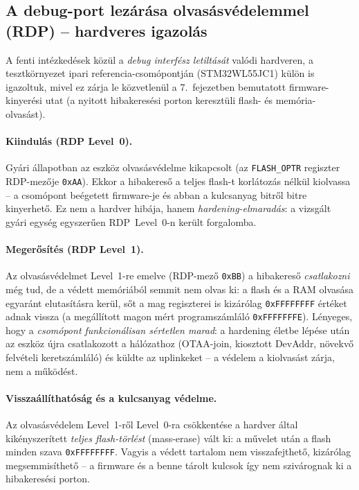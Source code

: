 \documentclass[12pt,a4paper]{article}
\begin{document}
\subsection{A debug-port lezárása olvasásvédelemmel (RDP) -- hardveres igazolás}

A fenti intézkedések közül a \emph{debug interfész letiltását} valódi
hardveren, a tesztkörnyezet ipari referencia-csomópontján
(STM32WL55JC1) külön is igazoltuk, mivel ez zárja le közvetlenül a
7.\ fejezetben bemutatott firmware-kinyerési utat (a nyitott
hibakeresési porton keresztüli flash- és memória-olvasást).

\paragraph{Kiindulás (RDP Level~0).} Gyári állapotban az eszköz
olvasásvédelme kikapcsolt (az \texttt{FLASH\_OPTR} regiszter RDP-mezője
\texttt{0xAA}). Ekkor a hibakereső a teljes flash-t korlátozás nélkül
kiolvassa -- a csomópont beégetett firmware-je és abban a kulcsanyag
bitről bitre kinyerhető. Ez nem a hardver hibája, hanem \emph{hardening-elmaradás}:
a vizsgált gyári egység egyszerűen RDP~Level~0-n került forgalomba.

\paragraph{Megerősítés (RDP Level~1).} Az olvasásvédelmet Level~1-re emelve
(RDP-mező \texttt{0xBB}) a hibakereső \emph{csatlakozni} még tud, de a
védett memóriából semmit nem olvas ki: a flash és a RAM olvasása egyaránt
elutasításra kerül, sőt a mag regiszterei is kizárólag \texttt{0xFFFFFFFF}
értéket adnak vissza (a megállított magon mért programszámláló
\texttt{0xFFFFFFFE}). Lényeges, hogy a \emph{csomópont funkcionálisan
sértetlen marad}: a hardening életbe lépése után az eszköz újra
csatlakozott a hálózathoz (OTAA-join, kiosztott DevAddr, növekvő
felvételi keretszámláló) és küldte az uplinkeket -- a védelem a
kiolvasást zárja, nem a működést.

\paragraph{Visszaállíthatóság és a kulcsanyag védelme.} Az olvasásvédelem
Level~1-ről Level~0-ra csökkentése a hardver által kikényszerített
\emph{teljes flash-törlést} (mass-erase) vált ki: a művelet után a flash
minden szava \texttt{0xFFFFFFFF}. Vagyis a védett tartalom nem
visszafejthető, kizárólag megsemmisíthető -- a firmware és a benne tárolt
kulcsok így nem szivárognak ki a hibakeresési porton.
\end{document}
